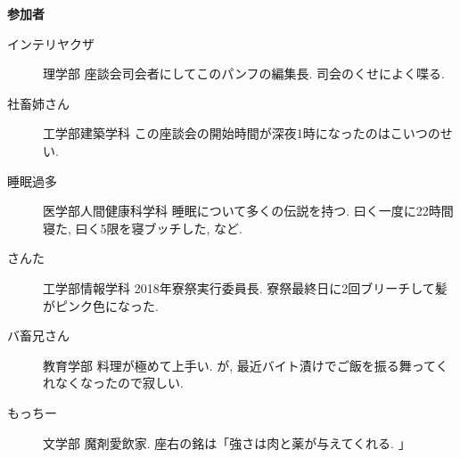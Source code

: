 \documentclass[10pt,b5jsbook,dvips,dvipdfmx,openany]{jsbook}
\theoremstyle{definition}
\begin{document}
		\begin{itembox}[l]{\bf 参加者}
		\begin{description}
		\item[インテリヤクザ] 理学部 座談会司会者にしてこのパンフの編集長. 司会のくせによく喋る. 
		\item[社畜姉さん]工学部建築学科 この座談会の開始時間が深夜1時になったのはこいつのせい. 
		\item[睡眠過多] 医学部人間健康科学科 睡眠について多くの伝説を持つ. 曰く一度に22時間寝た, 曰く5限を寝ブッチした, など. 
		\item[さんた] 工学部情報学科 2018年寮祭実行委員長. 寮祭最終日に2回ブリーチして髪がピンク色になった. 
		\item[バ畜兄さん] 教育学部 料理が極めて上手い. が, 最近バイト漬けでご飯を振る舞ってくれなくなったので寂しい. 
		\item[もっちー] 文学部 魔剤愛飲家. 座右の銘は「強さは肉と薬が与えてくれる. 」
		\end{description}
		\end{itembox}
\small
\end{document}
